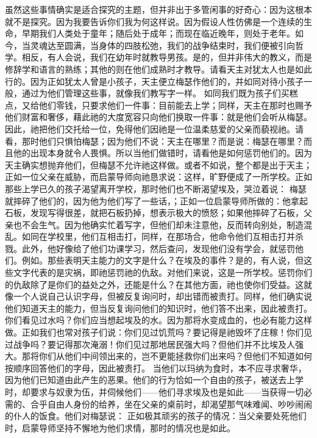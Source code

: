 虽然这些事情确实是适合探究的主题，但并非出于多管闲事的好奇心：因为这根本就不是探究。因为我要告诉你们我为何这样说。因为假设人性仿佛是一个连续的生命，早期我们人类处于童年；随后处于成年；而现在临近晚年，则处于老年。如今，当灵魂达至圆满，当身体的四肢松弛，我们的战争结束时，我们便被引向哲学。相反，有人会说，我们在幼年时就教导男孩。是的，但并非伟大的教义，而是修辞学和语言的熟练；其他的则在他们成熟时才教导。请看天主对犹太人也是如此行的。因为正如犹太人曾是小孩子，天主便立梅瑟作他们的，并如同对待小孩子一般，通过为他们管理这些事，就像我们教写字一样。 如同我们既为孩子们买糕点，又给他们零钱，只要求他们一件事：目前能去上学；同样，天主在那时也赐予他们财富和奢侈，藉此祂的大度宽容只向他们换取一件事：就是他们会听从梅瑟。因此，祂把他们交托给一位，免得他们因祂是一位温柔慈爱的父亲而藐视祂。请看，那时他们只惧怕梅瑟；因为他们不说：天主在哪里？而是说：梅瑟在哪里？而且他的出现本身就令人畏惧。所以当他们做错时，请看他是如何惩罚他们的。因为天主确实想抛弃他们，但梅瑟不允许祂这样做。或者不如说，整个都是出于天主；正如一位父亲在威胁，而启蒙导师向祂恳求说：这样，旷野便成了一所学校。正如那些上学已久的孩子渴望离开学校，那时他们也不断渴望埃及，哭泣着说： 梅瑟就摔碎了他们的，因为他为他们写了一些话，；正如一位启蒙导师所做的：他拿起石板，发现写得很差，就把石板扔掉，想表示极大的愤怒；如果他摔碎了石板，父亲也不会生气。因为他确实忙着写字，但他们却未注意他，反而转向别处，制造混乱。如同在学校里，他们互相击打，同样，在那场合，他命令他们互相击打并杀戮。此外，他好像给了他们功课学习，然后查问，发现他们没有学会，就惩罚他们。例如。那些表明天主能力的文字是什么？在埃及的事件？是的，有人说，但这些文字代表的是灾祸，即祂惩罚祂的仇敌。对他们来说，这是一所学校。惩罚你们的仇敌除了是你们的益处之外，还能是什么？在其他方面，祂也使你们受益。这就像一个人说自己认识字母，但被反复询问时，却出错而被责打。同样，他们确实说他们知道天主的能力，但当反复询问他们的知识时，他们答不出来，因此被责打。你们看见过水吗？你们应当想起埃及的水。因为那将水变成血的，也必有能力这样做。正如我们也常对孩子们说：你们见过饥荒吗？要记得是祂毁坏了庄稼！你们见过战争吗？要记得那次淹溺！你们见过那地居民强大吗？但他们并不比埃及人强大。那将你们从他们中间领出来的，岂不更能拯救你们出来吗？但他们不知道如何按顺序回答他们的字母，因此被责打。 当他们以玛纳为食时，本不应寻求奢华，因为他们已知道由此产生的恶果。他们的行为恰如一个自由的孩子，被送去上学时，却要求与奴隶为伍，并伺候他们——他们寻求埃及也是如此——当获得一切必需的、合乎自由人身份的给养，坐在父亲的桌前时，却渴望那气味难闻、吵吵闹闹的仆人的饭食。他们对梅瑟说： 正如极其顽劣的孩子的情况：当父亲要处死他们时，启蒙导师坚持不懈地为他们求情，那时的情况也是如此。\par

